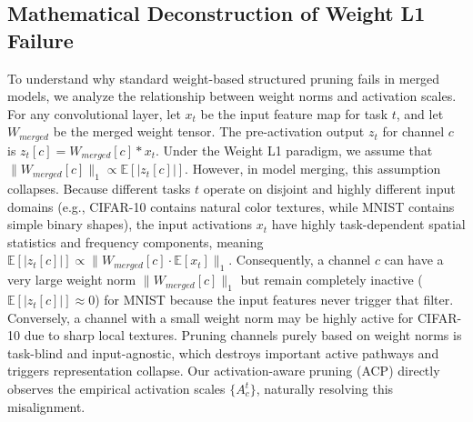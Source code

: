 \documentclass{article}
\theoremstyle{plain}
\theoremstyle{definition}
\theoremstyle{remark}
\begin{document}
\subsection{Mathematical Deconstruction of Weight L1 Failure}
To understand why standard weight-based structured pruning fails in merged models, we analyze the relationship between weight norms and activation scales. For any convolutional layer, let $x_t$ be the input feature map for task $t$, and let $W_{merged}$ be the merged weight tensor. The pre-activation output $z_t$ for channel $c$ is $z_t[c] = W_{merged}[c] * x_t$. Under the Weight L1 paradigm, we assume that $\|W_{merged}[c]\|_1 \propto \mathbb{E}[|z_t[c]|]$. However, in model merging, this assumption collapses. Because different tasks $t$ operate on disjoint and highly different input domains (e.g., CIFAR-10 contains natural color textures, while MNIST contains simple binary shapes), the input activations $x_t$ have highly task-dependent spatial statistics and frequency components, meaning $\mathbb{E}[|z_t[c]|] \propto \|W_{merged}[c] \cdot \mathbb{E}[x_t]\|_1$. Consequently, a channel $c$ can have a very large weight norm $\|W_{merged}[c]\|_1$ but remain completely inactive ($\mathbb{E}[|z_t[c]|] \approx 0$) for MNIST because the input features never trigger that filter. Conversely, a channel with a small weight norm may be highly active for CIFAR-10 due to sharp local textures. Pruning channels purely based on weight norms is task-blind and input-agnostic, which destroys important active pathways and triggers representation collapse. Our activation-aware pruning (ACP) directly observes the empirical activation scales $\{A^t_c\}$, naturally resolving this misalignment.
\end{document}
